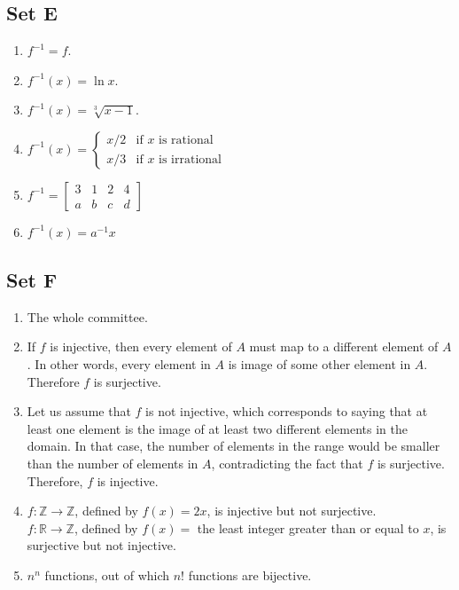 \subsection{Set E}
\begin{enumerate}
    \item $f^{-1} = f$.

    \item $f^{-1}(x) = \ln x$.

    \item $f^{-1}(x) = \sqrt[3]{x - 1}$.

    \item $f^{-1}(x) = \begin{cases}
        x/2 & \text{if $x$ is rational} \\
        x/3 & \text{if $x$ is irrational}
    \end{cases}$

    \item $f^{-1} = \begin{bmatrix}
        3 & 1 & 2 & 4 \\
        a & b & c & d
    \end{bmatrix}$

    \item $f^{-1}(x) = a^{-1}x$
\end{enumerate}

\subsection{Set F}
\begin{enumerate}
    \item The whole committee.

    \item If $f$ is injective, then every element of $A$ must map to a different element of $A$. In other words, every element in $A$ is image of some other element in $A$. Therefore $f$ is surjective.

    \item Let us assume that $f$ is not injective, which corresponds to saying that at least one element is the image of at least two different elements in the domain. In that case, the number of elements in the range would be smaller than the number of elements in $A$, contradicting the fact that $f$ is surjective. Therefore, $f$ is injective.

    \item $f: \mathbb{Z} \to \mathbb{Z}$, defined by $f(x) = 2x$, is injective but not surjective.\\
    $f: \mathbb{R} \to \mathbb{Z}$, defined by $f(x) = $ the least integer greater than or equal to $x$, is surjective but not injective.

    \item $n^n$ functions, out of which $n!$ functions are bijective.
\end{enumerate}

